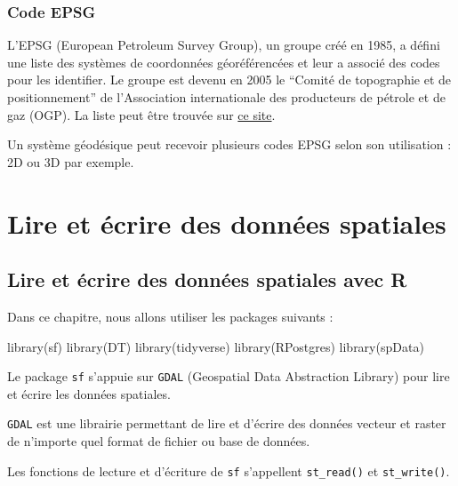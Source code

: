 \documentclass[
]{book}
\newenvironment{Shaded}{\begin{snugshade}}{\end{snugshade}}
\newcommand{\FunctionTok}[1]{\textcolor[rgb]{0.00,0.00,0.00}{#1}}
\newcommand{\NormalTok}[1]{#1}
\begin{document}
\hypertarget{code-epsg}{%
\section{Code EPSG}\label{code-epsg}}

L'EPSG (European Petroleum Survey Group), un groupe créé en 1985, a défini une liste des systèmes de coordonnées géoréférencées et leur a associé des codes pour les identifier. Le groupe est devenu en 2005 le ``Comité de topographie et de positionnement'' de l'Association internationale des producteurs de pétrole et de gaz (OGP). La liste peut être trouvée sur \href{http://www.epsg.org/}{ce site}.

Un système géodésique peut recevoir plusieurs codes EPSG selon son utilisation : 2D ou 3D par exemple.

\hypertarget{part-lire-et-uxe9crire-des-donnuxe9es-spatiales}{%
\part{Lire et écrire des données spatiales}\label{part-lire-et-uxe9crire-des-donnuxe9es-spatiales}}

\hypertarget{lire-et-uxe9crire-des-donnuxe9es-spatiales-avec-r}{%
\chapter{Lire et écrire des données spatiales avec R}\label{lire-et-uxe9crire-des-donnuxe9es-spatiales-avec-r}}

Dans ce chapitre, nous allons utiliser les packages suivants :

\begin{Shaded}
\begin{Highlighting}[]
\FunctionTok{library}\NormalTok{(sf)}
\FunctionTok{library}\NormalTok{(DT)}
\FunctionTok{library}\NormalTok{(tidyverse)}
\FunctionTok{library}\NormalTok{(RPostgres)}
\FunctionTok{library}\NormalTok{(spData)}
\end{Highlighting}
\end{Shaded}

Le package \texttt{sf} s'appuie sur \texttt{GDAL} (Geospatial Data Abstraction Library) pour lire et écrire les données spatiales.

\texttt{GDAL} est une librairie permettant de lire et d'écrire des données vecteur et raster de n'importe quel format de fichier ou base de données.

Les fonctions de lecture et d'écriture de \texttt{sf} s'appellent \texttt{st\_read()} et \texttt{st\_write()}.
\end{document}
